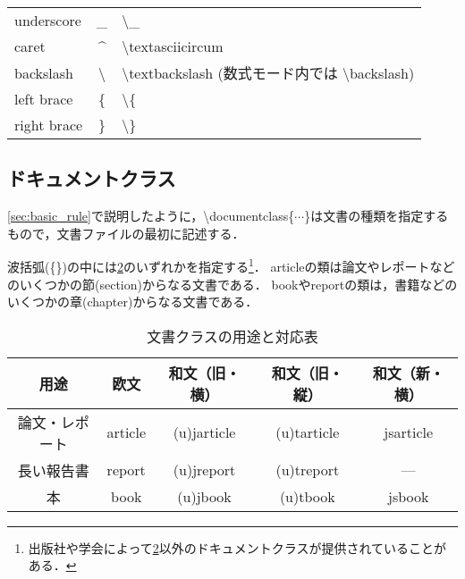 \begin{enumerate}
\begin{table}[H]
\begin{tabular}{lcl}
          underscore         & \_            & \textbackslash\_ \\ 
          caret              & \^{}          & \textbackslash textasciicircum \\ 
          backslash          & \textbackslash{} & \textbackslash textbackslash (数式モード内では \textbackslash backslash) \\ 
          left brace         & \{            & \textbackslash\{ \\ 
          right brace        & \}            & \textbackslash\} \\ \hline
        \end{tabular}
      \label{tab:special-characters}
      \end{table}
\end{enumerate}

\subsection{ドキュメントクラス}

\ref{sec:basic_rule}で説明したように，\textbackslash documentclass\{$\cdots$\}は文書の種類を指定するもので，文書ファイルの最初に記述する．

波括弧(\{\})の中には\tab\ref{tab:document-classes}のいずれかを指定する\footnote{出版社や学会によって\tab\ref{tab:document-classes}以外のドキュメントクラスが提供されていることがある．}．
articleの類は論文やレポートなどのいくつかの節(section)からなる文書である．
bookやreportの類は，書籍などのいくつかの章(chapter)からなる文書である．
\begin{table}[H]
  \caption{文書クラスの用途と対応表}
  \centering
    \begin{tabular}{c|cccc}
    \hline
      用途      & 欧文 & 和文（旧・横） & 和文（旧・縦） & 和文（新・横） \\ \hline
      論文・レポート    & article      & (u)jarticle             & (u)tarticle             & jsarticle               \\ 
      長い報告書        & report       & (u)jreport              & (u)treport              & ---                     \\ 
      本                & book         & (u)jbook                & (u)tbook                & jsbook                  \\ \hline
    \end{tabular}
  \label{tab:document-classes}
\end{table}

